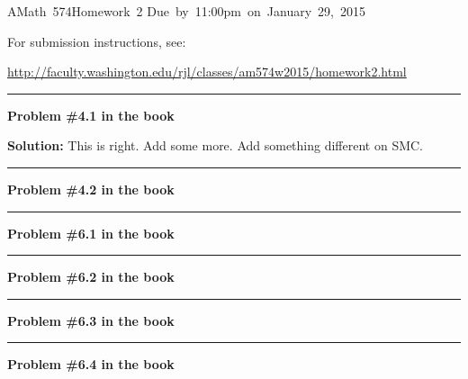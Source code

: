\documentclass[11pt]{article}
\begin{document}
\hfill\vbox{\hbox{AMath 574}\hbox{Homework 2}
\hbox{Due by 11:00pm on January 29, 2015}}

For submission instructions, see:

\url{http://faculty.washington.edu/rjl/classes/am574w2015/homework2.html}

\vskip 1cm
\hrule
{\bf Problem \#4.1 in the book}


\vskip 1cm
{\bf Solution:}
This is right.
Add some more.
Add something different on SMC.



\vskip 1cm
\hrule
{\bf Problem \#4.2 in the book}




\vskip 1cm
\hrule
{\bf Problem \#6.1 in the book}




\vskip 1cm
\hrule
{\bf Problem \#6.2 in the book}




\vskip 1cm
\hrule
{\bf Problem \#6.3 in the book}





\vskip 1cm
\hrule
{\bf Problem \#6.4 in the book}


\end{document}
